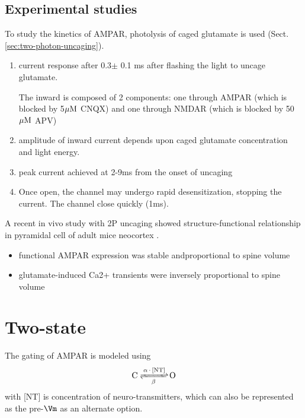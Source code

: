 \subsection{Experimental studies}

To study the kinetics of AMPAR, photolysis of caged glutamate is used
(Sect.\ref{sec:two-photon-uncaging}).

\begin{enumerate}
  \item current response after 0.3$\pm$ 0.1 ms after flashing the light to
  uncage glutamate.
  
  The inward is composed of 2 components: one through AMPAR (which is blocked
  by 5${\mu\text{M}}$ CNQX) and one through NMDAR (which is blocked by 50${\mu\text{M}}$ APV)
  
  \item amplitude of inward current depends upon caged glutamate concentration
  and light energy.
  
  \item peak current achieved at 2-9ms from the onset of uncaging
  
  \item Once open, the channel may undergo rapid desensitization, stopping the
  current. The channel  close quickly (1ms).
\end{enumerate}

A recent in vivo study with 2P uncaging showed structure-functional relationship
in pyramidal cell of adult mice neocortex \citep{noguchi2011}.
\begin{itemize}
  \item  functional AMPAR expression was stable andproportional
to spine volume

  \item glutamate-induced Ca2+ transients were inversely proportional to spine
  volume
\end{itemize}



\section{Two-state}


The gating of AMPAR is modeled using 
\begin{equation}
\ce{ C <=>[\alpha.\text{[NT]}][\beta] O}
\end{equation}
with [NT] is concentration of neuro-transmitters, which can also be represented
as the pre-$\Vm$ as an alternate option.

